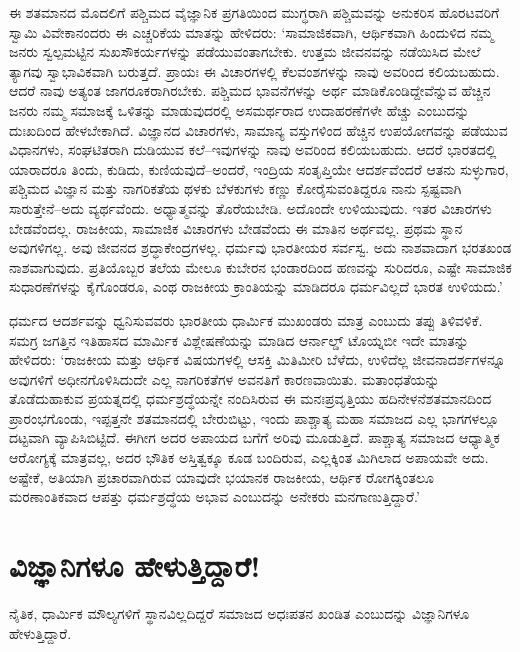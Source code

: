 ಈ ಶತಮಾನದ ಮೊದಲಿಗೆ ಪಶ್ಚಿಮದ ವೈಜ್ಞಾನಿಕ ಪ್ರಗತಿಯಿಂದ ಮುಗ್ಧರಾಗಿ ಪಶ್ಚಿಮವನ್ನು ಅನುಕರಿಸ ಹೊರಟವರಿಗೆ ಸ್ವಾಮಿ ವಿವೇಕಾನಂದರು ಈ ಎಚ್ಚರಿಕೆಯ ಮಾತನ್ನು ಹೇಳಿದರು: ‘ಸಾಮಾಜಿಕವಾಗಿ, ಆರ್ಥಿಕವಾಗಿ ಹಿಂದುಳಿದ ನಮ್ಮ ಜನರು ಸ್ವಲ್ಪಮಟ್ಟಿನ ಸುಖಸೌಕರ್ಯಗಳನ್ನು ಪಡೆಯುವಂತಾಗಬೇಕು. ಉತ್ತಮ ಜೀವನವನ್ನು ನಡೆಯಿಸಿದ ಮೇಲೆ ತ್ಯಾಗವು ಸ್ವಾಭಾವಿಕವಾಗಿ ಬರುತ್ತದೆ. ಪ್ರಾಯಃ ಈ ವಿಚಾರಗಳಲ್ಲಿ ಕೆಲವಂಶಗಳನ್ನು ನಾವು ಅವರಿಂದ ಕಲಿಯಬಹುದು. ಆದರೆ ನಾವು ಅತ್ಯಂತ ಜಾಗರೂಕರಾಗಿರಬೇಕು. ಪಶ್ಚಿಮದ ಭಾವನೆಗಳನ್ನು ಅರ್ಥ ಮಾಡಿಕೊಂಡಿದ್ದೇವೆನ್ನುವ ಹೆಚ್ಚಿನ ಜನರು ನಮ್ಮ ಸಮಾಜಕ್ಕೆ ಒಳಿತನ್ನು ಮಾಡುವುದರಲ್ಲಿ ಅಸಮರ್ಥರಾದ ಉದಾಹರಣೆಗಳೇ ಹೆಚ್ಚು ಎಂಬುದನ್ನು ದುಃಖದಿಂದ ಹೇಳಬೇಕಾಗಿದೆ. ವಿಜ್ಞಾನದ ವಿಚಾರಗಳು, ಸಾಮಾನ್ಯ ವಸ್ತುಗಳಿಂದ ಹೆಚ್ಚಿನ ಉಪಯೋಗವನ್ನು ಪಡೆಯುವ ವಿಧಾನಗಳು, ಸಂಘಟಿತರಾಗಿ ದುಡಿಯುವ ಕಲೆ–ಇವುಗಳನ್ನು ನಾವು ಅವರಿಂದ ಕಲಿಯಬಹುದು. ಆದರೆ ಭಾರತದಲ್ಲಿ ಯಾರಾದರೂ ತಿಂದು, ಕುಡಿದು, ಕುಣಿಯವುದೆ–ಅಂದರೆ, ಇಂದ್ರಿಯ ಸಂತೃಪ್ತಿಯೇ ಆದರ್ಶವೆಂದರೆ ಆತನು ಸುಳ್ಳುಗಾರ, ಪಶ್ಚಿಮದ ವಿಜ್ಞಾನ ಮತ್ತು ನಾಗರಿಕತೆಯ ಥಳಕು ಬೆಳಕುಗಳು ಕಣ್ಣು ಕೋರೈಸುವಂತಿದ್ದರೂ ನಾನು ಸ್ಪಷ್ಟವಾಗಿ ಸಾರುತ್ತೇನೆ–ಅದು ವ್ಯರ್ಥವೆಂದು. ಅಧ್ಯಾತ್ಮವನ್ನು ತೊರೆಯಬೇಡಿ. ಅದೊಂದೇ ಉಳಿಯುವುದು. ಇತರ ವಿಚಾರಗಳು ಬೇಡವೆಂದಲ್ಲ. ರಾಜಕೀಯ, ಸಾಮಾಜಿಕ ವಿಚಾರಗಳು ಬೇಡವೆಂದು ಈ ಮಾತಿನ ಅರ್ಥವಲ್ಲ. ಪ್ರಥಮ ಸ್ಥಾನ ಅವುಗಳಿಗಲ್ಲ. ಅವು ಜೀವನದ ಶ್ರದ್ಧಾಕೇಂದ್ರಗಳಲ್ಲ. ಧರ್ಮವು ಭಾರತೀಯರ ಸರ್ವಸ್ವ. ಅದು ನಾಶವಾದಾಗ ಭರತಖಂಡ ನಾಶವಾಗುವುದು. ಪ್ರತಿಯೊಬ್ಬರ ತಲೆಯ ಮೇಲೂ ಕುಬೇರನ ಭಂಡಾರದಿಂದ ಹಣವನ್ನು ಸುರಿದರೂ, ಎಷ್ಟೇ ಸಾಮಾಜಿಕ ಸುಧಾರಣೆಗಳನ್ನು ಕೈಗೊಂಡರೂ, ಎಂಥ ರಾಜಕೀಯ ಕ್ರಾಂತಿಯನ್ನು ಮಾಡಿದರೂ ಧರ್ಮವಿಲ್ಲದೆ ಭಾರತ ಉಳಿಯದು.’

ಧರ್ಮದ ಆದರ್ಶವನ್ನು ಧ್ವನಿಸುವವರು ಭಾರತೀಯ ಧಾರ್ಮಿಕ ಮುಖಂಡರು ಮಾತ್ರ ಎಂಬುದು ತಪ್ಪು ತಿಳಿವಳಿಕೆ. ಸಮಗ್ರ ಜಗತ್ತಿನ ಇತಿಹಾಸದ ಮಾರ್ಮಿಕ ವಿಶ್ಲೇಷಣೆಯನ್ನು ಮಾಡಿದ ಆರ್ನಾಲ್ಡ್ ಟೊಯ್ನಬೀ ಇದೇ ಮಾತನ್ನು ಹೇಳಿದರು: ‘ರಾಜಕೀಯ ಮತ್ತು ಆರ್ಥಿಕ ವಿಷಯಗಳಲ್ಲಿ ಆಸಕ್ತಿ ಮಿತಿಮೀರಿ ಬೆಳೆದು, ಉಳಿದೆಲ್ಲ ಜೀವನಾದರ್ಶಗಳನ್ನೂ ಅವುಗಳಿಗೆ ಅಧೀನಗೊಳಿಸಿದುದೇ ಎಲ್ಲ ನಾಗರಿಕತೆಗಳ ಅವನತಿಗೆ ಕಾರಣವಾಯಿತು. ಮತಾಂಧತೆಯನ್ನು ತೊಡೆದುಹಾಕುವ ಪ್ರಯತ್ನದಲ್ಲಿ ಧರ್ಮಶ್ರದ್ಧೆಯನ್ನೇ ನಂದಿಸಿರುವ ಈ ಮನಃಪ್ರವೃತ್ತಿಯು ಹದಿನೇಳನೆ\break ಶತಮಾನದಿಂದ ಪ್ರಾರಂಭಗೊಂಡು, ಇಪ್ಪತ್ತನೇ ಶತಮಾನದಲ್ಲಿ ಬೇರುಬಿಟ್ಟು, ಇಂದು ಪಾಶ್ಚಾತ್ಯ ಮಹಾ ಸಮಾಜದ ಎಲ್ಲ ಭಾಗಗಳಲ್ಲೂ ದಟ್ಟವಾಗಿ ವ್ಯಾಪಿಸಿಬಿಟ್ಟಿದೆ. ಈಗೀಗ ಅದರ ಅಪಾಯದ ಬಗೆಗೆ ಅರಿವು ಮೂಡುತ್ತಿದೆ. ಪಾಶ್ಚಾತ್ಯ ಸಮಾಜದ ಆಧ್ಯಾತ್ಮಿಕ ಆರೋಗ್ಯಕ್ಕೆ ಮಾತ್ರವಲ್ಲ, ಅದರ ಭೌತಿಕ ಅಸ್ತಿತ್ವಕ್ಕೂ ಕೂಡ ಬಂದಿರುವ, ಎಲ್ಲಕ್ಕಿಂತ ಮಿಗಿಲಾದ ಅಪಾಯವೇ ಅದು. ಅಷ್ಟೇಕೆ, ಅತಿಯಾಗಿ ಪ್ರಚಾರವಾಗಿರುವ ಯಾವುದೇ ಭಯಾನಕ ರಾಜಕೀಯ, ಆರ್ಥಿಕ ರೋಗಕ್ಕಿಂತಲೂ ಮರಣಾಂತಿಕವಾದ ಆಪತ್ತು ಧರ್ಮಶ್ರದ್ಧೆಯ ಅಭಾವ ಎಂಬುದನ್ನು ಅನೇಕರು ಮನಗಾಣುತ್ತಿದ್ದಾರೆ.’


\section*{ವಿಜ್ಞಾನಿಗಳೂ ಹೇಳುತ್ತಿದ್ದಾರೆ!}


ನೈತಿಕ, ಧಾರ್ಮಿಕ ಮೌಲ್ಯಗಳಿಗೆ ಸ್ಥಾನವಿಲ್ಲದಿದ್ದರೆ ಸಮಾಜದ ಅಧಃಪತನ ಖಂಡಿತ ಎಂಬುದನ್ನು ವಿಜ್ಞಾನಿಗಳೂ ಹೇಳುತ್ತಿದ್ದಾರೆ.

